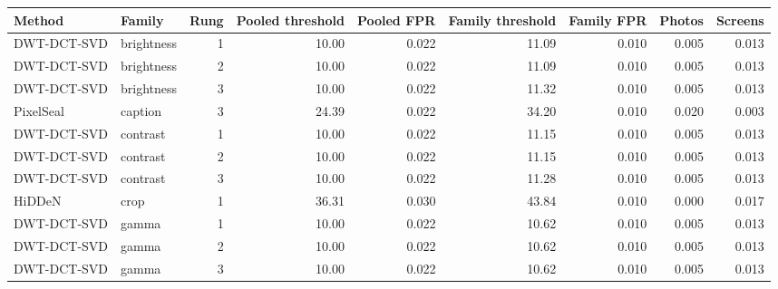 \begin{tabular}{llrrrrrrr}
\toprule
Method & Family & Rung & Pooled threshold & Pooled FPR & Family threshold & Family FPR & Photos & Screens \\
\midrule
DWT-DCT-SVD & brightness & 1 & 10.00 & 0.022 & 11.09 & 0.010 & 0.005 & 0.013 \\
DWT-DCT-SVD & brightness & 2 & 10.00 & 0.022 & 11.09 & 0.010 & 0.005 & 0.013 \\
DWT-DCT-SVD & brightness & 3 & 10.00 & 0.022 & 11.32 & 0.010 & 0.005 & 0.013 \\
PixelSeal & caption & 3 & 24.39 & 0.022 & 34.20 & 0.010 & 0.020 & 0.003 \\
DWT-DCT-SVD & contrast & 1 & 10.00 & 0.022 & 11.15 & 0.010 & 0.005 & 0.013 \\
DWT-DCT-SVD & contrast & 2 & 10.00 & 0.022 & 11.15 & 0.010 & 0.005 & 0.013 \\
DWT-DCT-SVD & contrast & 3 & 10.00 & 0.022 & 11.28 & 0.010 & 0.005 & 0.013 \\
HiDDeN & crop & 1 & 36.31 & 0.030 & 43.84 & 0.010 & 0.000 & 0.017 \\
DWT-DCT-SVD & gamma & 1 & 10.00 & 0.022 & 10.62 & 0.010 & 0.005 & 0.013 \\
DWT-DCT-SVD & gamma & 2 & 10.00 & 0.022 & 10.62 & 0.010 & 0.005 & 0.013 \\
DWT-DCT-SVD & gamma & 3 & 10.00 & 0.022 & 10.62 & 0.010 & 0.005 & 0.013 \\
\bottomrule
\end{tabular}
